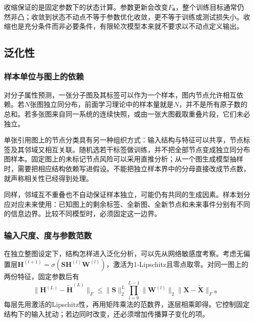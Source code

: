 收缩保证的是固定参数下的状态计算。参数更新会改变$F_{\bm{\theta}}$，整个训练目标通常仍然非凸；收敛到状态不动点不等于参数优化收敛，更不等于训练或测试损失小。收缩也是充分条件而非必要条件，有限轮次模型本来就不要求以不动点定义输出。

\subsection{泛化性}
\label{sec:gnn-generalization}

\subsubsection{样本单位与图上的依赖}
\label{sec:gnn-sample-units}

对分子属性预测，一张分子图及其标签可以作为一个样本，图内节点允许相互依赖。若$N$张图独立同分布，前面学习理论中的样本量就是$N$，并不是所有原子数的总和。若多张图来自同一系统的连续快照，或由一张大图截取重叠片段，它们未必独立。

单张引用图上的节点分类具有另一种组织方式：输入结构与特征可以共享，节点标签及其邻域又相互关联。随机选若干标签做训练，并不把全部节点变成独立同分布图样本。固定图上的未标记节点风险可以采用直推分析；从一个图生成模型抽样时，需要把相应结构依赖写进假设。不能把独立样本界中的分母直接改成节点数，就声称相关性已经得到处理。

同样，邻域互不重叠也不自动保证样本独立，可能仍有共同的生成因素。样本划分应对应未来使用：已知图上的剩余标签、全新图、全新节点和未来事件分别有不同的信息边界。比较不同模型时，必须固定这一边界。

\subsubsection{输入尺度、度与参数范数}
\label{sec:gnn-norm-generalization}

在独立整图设定下，结构怎样进入泛化分析，可以先从网络敏感度考察。考虑无偏置层$\bm{H}^{(l+1)}=\sigma(\bm{S}\bm{H}^{(l)}\bm{W}^{(l)})$，激活为1-Lipschitz且零点取零。对同一图上的两份特征，固定参数后有
\begin{equation}
  \lVert\bm{H}^{(L)}-\widetilde{\bm{H}}^{(L)}\rVert_F
    \leq\lVert\bm{S}\rVert_2^L
      \prod_{l=0}^{L-1}\lVert\bm{W}^{(l)}\rVert_2
      \lVert\bm{X}-\widetilde{\bm{X}}\rVert_F\text{。}
  \label{eq:gnn-feature-sensitivity}
\end{equation}
每层先用激活的Lipschitz性，再用矩阵乘法的范数界，逐层相乘即得。它控制固定结构下的输入扰动；若边同时改变，还必须增加传播算子变化的项。

